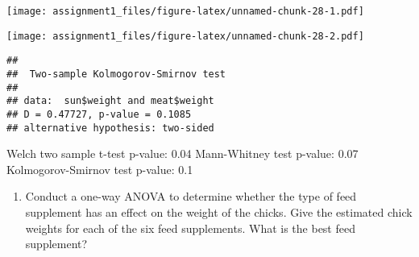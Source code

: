 \documentclass[
]{article}
\newenvironment{Shaded}{\begin{snugshade}}{\end{snugshade}}
\newcommand{\FunctionTok}[1]{\textcolor[rgb]{0.00,0.00,0.00}{#1}}
\newcommand{\NormalTok}[1]{#1}
\newcommand{\SpecialCharTok}[1]{\textcolor[rgb]{0.00,0.00,0.00}{#1}}
\providecommand{\tightlist}{%
  \setlength{\itemsep}{0pt}\setlength{\parskip}{0pt}}
\begin{document}
\begin{Shaded}
\end{Shaded}

\texttt{[image: assignment1\_files/figure-latex/unnamed-chunk-28-1.pdf]}

\begin{Shaded}
\end{Shaded}

\texttt{[image: assignment1\_files/figure-latex/unnamed-chunk-28-2.pdf]}

\begin{Shaded}
\end{Shaded}

\begin{verbatim}
## 
##  Two-sample Kolmogorov-Smirnov test
## 
## data:  sun$weight and meat$weight
## D = 0.47727, p-value = 0.1085
## alternative hypothesis: two-sided
\end{verbatim}

Welch two sample t-test p-value: 0.04 Mann-Whitney test p-value: 0.07
Kolmogorov-Smirnov test p-value: 0.1

\begin{enumerate}
\def\labelenumi{\alph{enumi})}
\setcounter{enumi}{1}
\tightlist
\item
  Conduct a one-way ANOVA to determine whether the type of feed
  supplement has an effect on the weight of the chicks. Give the
  estimated chick weights for each of the six feed supplements. What is
  the best feed supplement?
\end{enumerate}
\end{document}
